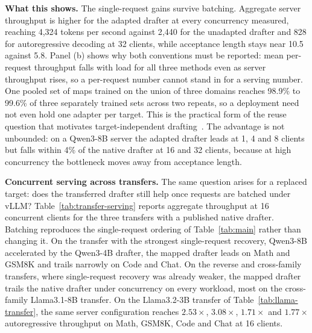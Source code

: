 

\textbf{What this shows.} The single-request gains survive batching. Aggregate server throughput is higher for the adapted drafter at every concurrency measured, reaching 4{,}324 tokens per second against 2{,}440 for the unadapted drafter and 828 for autoregressive decoding at 32 clients, while acceptance length stays near 10.5 against 5.8. Panel (b) shows why both conventions must be reported: mean per-request throughput falls with load for all three methods even as server throughput rises, so a per-request number cannot stand in for a serving number. One pooled set of maps trained on the union of three domains reaches 98.9\% to 99.6\% of three separately trained sets across two repeats, so a deployment need not even hold one adapter per target. This is the practical form of the reuse question that motivates target-independent drafting~\citep{an2026pard2}. The advantage is not unbounded: on a Qwen3-8B server the adapted drafter leads at 1, 4 and 8 clients but falls within 4\% of the native drafter at 16 and 32 clients, because at high concurrency the bottleneck moves away from acceptance length.

\textbf{Concurrent serving across transfers.} The same question arises for a replaced target: does the transferred drafter still help once requests are batched under vLLM? Table~\ref{tab:transfer-serving} reports aggregate throughput at 16 concurrent clients for the three transfers with a published native drafter. Batching reproduces the single-request ordering of Table~\ref{tab:main} rather than changing it. On the transfer with the strongest single-request recovery, Qwen3-8B accelerated by the Qwen3-4B drafter, the mapped drafter leads on Math and GSM8K and trails narrowly on Code and Chat. On the reverse and cross-family transfers, where single-request recovery was already weaker, the mapped drafter trails the native drafter under concurrency on every workload, most on the cross-family Llama3.1-8B transfer. On the Llama3.2-3B transfer of Table~\ref{tab:llama-transfer}, the same server configuration reaches $2.53\times$, $3.08\times$, $1.71\times$ and $1.77\times$ autoregressive throughput on Math, GSM8K, Code and Chat at 16 clients.


